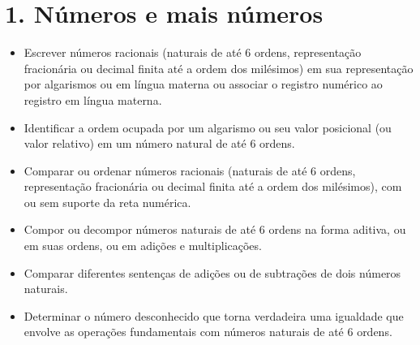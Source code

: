 \chapter{1. Números e mais números}



\begin{itemize}
\item Escrever números racionais (naturais de até 6 ordens, representação
fracionária ou decimal finita até a ordem dos milésimos) em sua
representação por algarismos ou em língua materna ou associar o registro
numérico ao registro em língua materna.

\item Identificar a ordem ocupada por um algarismo ou seu valor posicional
(ou valor relativo) em um número natural de até 6 ordens.

\item Comparar ou ordenar números racionais (naturais de até 6 ordens,
representação fracionária ou decimal finita até a ordem dos milésimos),
com ou sem suporte da reta numérica.

\item Compor ou decompor números naturais de até 6 ordens na forma aditiva,
ou em suas ordens, ou em adições e multiplicações.

\item Comparar diferentes sentenças de adições ou de subtrações de dois números naturais.

\item Determinar o número desconhecido que torna verdadeira uma igualdade
que envolve as operações fundamentais com números naturais de até 6
ordens.
\end{itemize}

